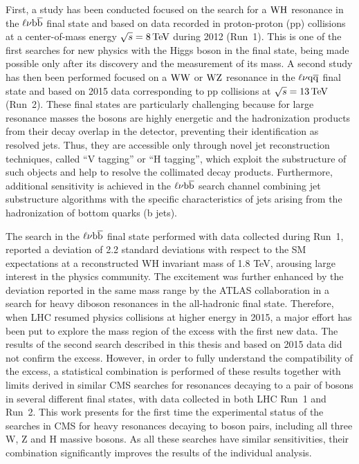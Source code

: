 First, a study has been conducted focused on the search for a $\mathrm{W}\mathrm{H}$ resonance in the $\ell\nu{\mathrm{b}\overline{\mathrm{b}}}$ final state and based on data recorded in proton-proton (pp) collisions at a center-of-mass energy $\sqrt{s} = 8\,\text{Te\hspace{-.08em}V}$ during 2012 (Run~1). This is one of the first searches for new physics with the Higgs boson in the final state, being made possible only after its discovery and the measurement of its mass.
A second study has then been performed focused on a $\mathrm{W}\mathrm{W}$ or $\mathrm{W}\mathrm{Z}$ resonance in the $\ell\nu\mathrm{q}\overline{\mathrm{q}}$ final state and based on 2015 data corresponding to pp collisions at $\sqrt{s} = 13\,\text{Te\hspace{-.08em}V}$ (Run~2).
These final states are particularly challenging because for large resonance masses the bosons are highly energetic and the hadronization products from their decay overlap in the detector, preventing their identification as resolved jets.
Thus, they are accessible only through novel jet reconstruction techniques, called ``V tagging'' or ``H tagging'', which exploit the substructure of such objects and help to resolve the collimated decay products.
Furthermore, additional sensitivity is achieved in the $\ell\nu{\mathrm{b}\overline{\mathrm{b}}}$ search channel combining jet substructure algorithms with the specific characteristics of jets arising from the hadronization of bottom quarks (b jets).

The search in the $\ell\nu{\mathrm{b}\overline{\mathrm{b}}}$ final state performed with data collected during Run~1, reported a deviation of 2.2 standard deviations with respect to the SM expectations at a reconstructed WH invariant mass of 1.8 TeV, arousing large interest in the physics community. The excitement was further enhanced by the deviation reported in the same mass range by the ATLAS collaboration in a search for heavy diboson resonances in the all-hadronic final state. 
Therefore, when LHC resumed physics collisions at higher energy in 2015, a major effort has been put to explore the mass region of the excess with the first new data. The results of the second search described in this thesis and based on 2015 data did not confirm the excess. However, in order to fully understand the compatibility of the excess, a statistical combination is performed of these results together with limits derived in similar CMS searches for resonances decaying to a pair of bosons in several different final states, with data collected in both LHC Run~1 and Run~2.
This work presents for the first time the experimental status of the searches in CMS for heavy resonances decaying to boson pairs, including all three W, Z and H massive bosons.
As all these searches have similar sensitivities, their combination significantly improves the results of the individual analysis.

